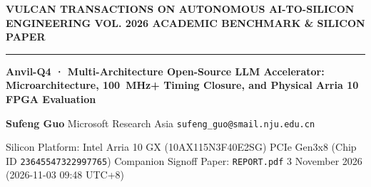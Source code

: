 \documentclass[11pt,a4paper]{article}
\begin{document}
{\scriptsize\sffamily\textcolor{vulcan}{\textbf{VULCAN TRANSACTIONS ON AUTONOMOUS AI-TO-SILICON ENGINEERING \hfill VOL. 2026 \textperiodcentered{} ACADEMIC BENCHMARK \& SILICON PAPER}}\par}

\vspace{1pt}\textcolor{vulcan}{\rule{\textwidth}{1.2pt}}\vspace{3pt}

\begin{center}

{\sffamily\LARGE\bfseries Anvil-Q4 · Multi-Architecture Open-Source LLM Accelerator: Microarchitecture, 100~MHz+ Timing Closure, and Physical Arria 10 FPGA Evaluation\par}\vspace{3pt}

{\small\sffamily\textbf{Sufeng Guo} \textperiodcentered{} Microsoft Research Asia \textperiodcentered{} \texttt{sufeng\_guo@smail.nju.edu.cn}\par}\vspace{1pt}

{\scriptsize\sffamily\textcolor{black!75}{Silicon Platform: Intel Arria 10 GX (\allowbreak{}10AX115N3F40E2SG)\allowbreak{} PCIe Gen3x8 (Chip ID \texttt{23645547322997765}) \textperiodcentered{} Companion Signoff Paper: \texttt{REPORT.pdf} \textperiodcentered{} 3 November 2026 (\allowbreak{}2026-11-03 09:48 UTC+\allowbreak{}8)\allowbreak{}}\par}

\end{center}\vspace{2pt}
\end{document}
